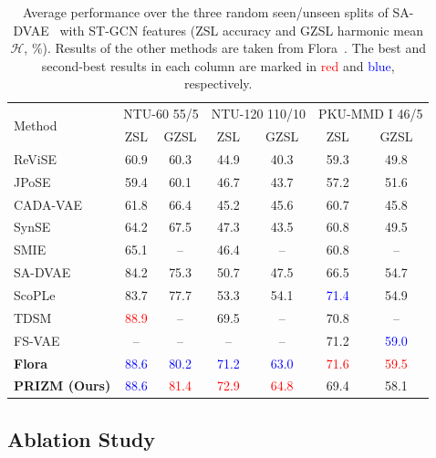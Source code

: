 \documentclass[11pt]{article}
\begin{document}
\begin{table}[htbp]
\centering
\caption{Average performance over the three random seen/unseen splits of SA-DVAE~\cite{savae24} with ST-GCN features (ZSL accuracy and GZSL harmonic mean $\mathcal{H}$, \%). Results of the other methods are taken from Flora~\cite{flora26}. The best and second-best results in each column are marked in \textcolor{red}{red} and \textcolor{blue}{blue}, respectively.}
\label{tab:random}
\small
\setlength{\tabcolsep}{5pt}
\newcommand{\best}[1]{\textcolor{red}{#1}}
\newcommand{\second}[1]{\textcolor{blue}{#1}}
\begin{tabular}{l|cc|cc|cc}
\hline
\multirow{2}{*}{Method} & \multicolumn{2}{c|}{NTU-60 55/5} & \multicolumn{2}{c|}{NTU-120 110/10} & \multicolumn{2}{c}{PKU-MMD I 46/5} \\
& ZSL & GZSL & ZSL & GZSL & ZSL & GZSL \\
\hline
ReViSE~\cite{reVISE17} & 60.9 & 60.3 & 44.9 & 40.3 & 59.3 & 49.8 \\
JPoSE~\cite{jpose19} & 59.4 & 60.1 & 46.7 & 43.7 & 57.2 & 51.6 \\
CADA-VAE~\cite{cadavae19} & 61.8 & 66.4 & 45.2 & 45.6 & 60.7 & 45.8 \\
SynSE~\cite{synse21} & 64.2 & 67.5 & 47.3 & 43.5 & 60.8 & 49.5 \\
SMIE~\cite{smie23} & 65.1 & -- & 46.4 & -- & 60.8 & -- \\
SA-DVAE~\cite{savae24} & 84.2 & 75.3 & 50.7 & 47.5 & 66.5 & 54.7 \\
ScoPLe~\cite{scople25} & 83.7 & 77.7 & 53.3 & 54.1 & \second{71.4} & 54.9 \\
TDSM~\cite{tdsm25} & \best{88.9} & -- & 69.5 & -- & 70.8 & -- \\
FS-VAE~\cite{fsvae25} & -- & -- & -- & -- & 71.2 & \second{59.0} \\
\textbf{Flora}~\cite{flora26} & \second{88.6} & \second{80.2} & \second{71.2} & \second{63.0} & \best{71.6} & \best{59.5} \\
\hline
\textbf{PRIZM (Ours)} & \second{88.6} & \best{81.4} & \best{72.9} & \best{64.8} & 69.4 & 58.1 \\
\hline
\end{tabular}
\end{table}

\subsection{Ablation Study}
\label{sec:ablation}
\end{document}
